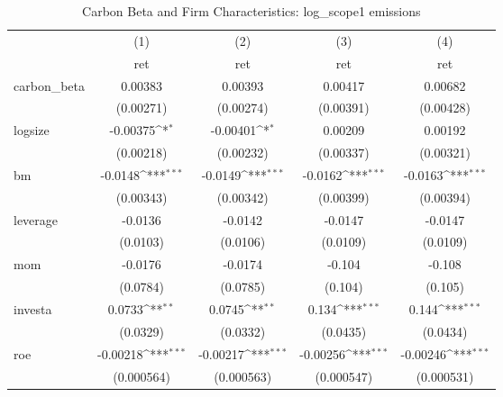 \begin{table}[htbp]\centering
\def\sym#1{\ifmmode^{#1}\else\(^{#1}\)\fi}
\caption{Carbon Beta and Firm Characteristics: log\_scope1 emissions}
\begin{tabular}{l*{4}{c}}
\hline\hline
                    &\multicolumn{1}{c}{(1)}&\multicolumn{1}{c}{(2)}&\multicolumn{1}{c}{(3)}&\multicolumn{1}{c}{(4)}\\
                    &\multicolumn{1}{c}{ret}&\multicolumn{1}{c}{ret}&\multicolumn{1}{c}{ret}&\multicolumn{1}{c}{ret}\\
\hline
carbon\_beta         &     0.00383         &     0.00393         &     0.00417         &     0.00682         \\
                    &   (0.00271)         &   (0.00274)         &   (0.00391)         &   (0.00428)         \\
[1em]
logsize             &    -0.00375\sym{*}  &    -0.00401\sym{*}  &     0.00209         &     0.00192         \\
                    &   (0.00218)         &   (0.00232)         &   (0.00337)         &   (0.00321)         \\
[1em]
bm                  &     -0.0148\sym{***}&     -0.0149\sym{***}&     -0.0162\sym{***}&     -0.0163\sym{***}\\
                    &   (0.00343)         &   (0.00342)         &   (0.00399)         &   (0.00394)         \\
[1em]
leverage            &     -0.0136         &     -0.0142         &     -0.0147         &     -0.0147         \\
                    &    (0.0103)         &    (0.0106)         &    (0.0109)         &    (0.0109)         \\
[1em]
mom                 &     -0.0176         &     -0.0174         &      -0.104         &      -0.108         \\
                    &    (0.0784)         &    (0.0785)         &     (0.104)         &     (0.105)         \\
[1em]
investa             &      0.0733\sym{**} &      0.0745\sym{**} &       0.134\sym{***}&       0.144\sym{***}\\
                    &    (0.0329)         &    (0.0332)         &    (0.0435)         &    (0.0434)         \\
[1em]
roe                 &    -0.00218\sym{***}&    -0.00217\sym{***}&    -0.00256\sym{***}&    -0.00246\sym{***}\\
                    &  (0.000564)         &  (0.000563)         &  (0.000547)         &  (0.000531)         \\

\end{tabular}
\end{table}
